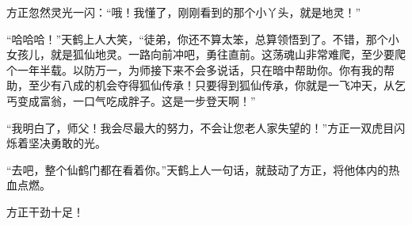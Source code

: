 \begin{this_body}
方正忽然灵光一闪：“哦！我懂了，刚刚看到的那个小丫头，就是地灵！”

“哈哈哈！”天鹤上人大笑，“徒弟，你还不算太笨，总算领悟到了。不错，那个小女孩儿，就是狐仙地灵。一路向前冲吧，勇往直前。这荡魂山非常难爬，至少要爬个一年半载。以防万一，为师接下来不会多说话，只在暗中帮助你。你有我的帮助，至少有八成的机会夺得狐仙传承！只要得到狐仙传承，你就是一飞冲天，从乞丐变成富翁，一口气吃成胖子。这是一步登天啊！”

“我明白了，师父！我会尽最大的努力，不会让您老人家失望的！”方正一双虎目闪烁着坚决勇敢的光。

“去吧，整个仙鹤门都在看着你。”天鹤上人一句话，就鼓动了方正，将他体内的热血点燃。

方正干劲十足！

\end{this_body}

